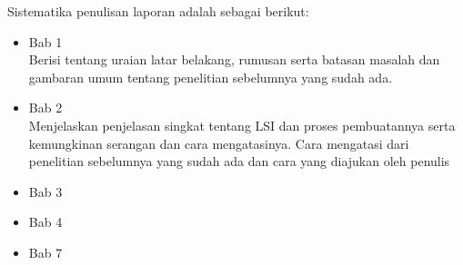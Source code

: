 Sistematika penulisan laporan adalah sebagai berikut:
\begin{itemize}
	\item Bab 1 \babSatu \\
	Berisi tentang uraian latar belakang, rumusan serta batasan masalah dan gambaran umum tentang penelitian sebelumnya yang sudah ada.
	\item Bab 2 \babDua \\
	Menjelaskan penjelasan singkat tentang LSI dan proses pembuatannya serta kemungkinan serangan dan cara mengatasinya. Cara mengatasi dari penelitian sebelumnya yang sudah ada dan cara yang diajukan oleh penulis 
	\item Bab 3 \babTiga \\
	
	\item Bab 4 \babEmpat \\
	\item Bab 7 \kesimpulan \\
\end{itemize}

